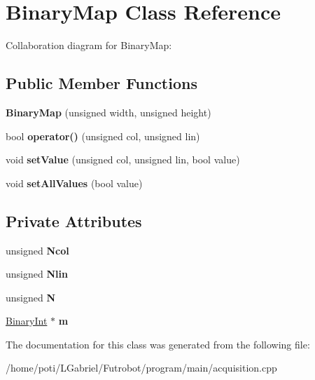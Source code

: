 \hypertarget{classBinaryMap}{}\section{Binary\+Map Class Reference}
\label{classBinaryMap}


Collaboration diagram for Binary\+Map\+:
\subsection*{Public Member Functions}
\begin{DoxyCompactItemize}
\item 
{\bfseries Binary\+Map} (unsigned width, unsigned height)\hypertarget{classBinaryMap_a31956e294536f47cc2a45bad2fd2e9c6}{}\label{classBinaryMap_a31956e294536f47cc2a45bad2fd2e9c6}

\item 
bool {\bfseries operator()} (unsigned col, unsigned lin)\hypertarget{classBinaryMap_aa6cf630265a7f7fa9193d03ecae69c5e}{}\label{classBinaryMap_aa6cf630265a7f7fa9193d03ecae69c5e}

\item 
void {\bfseries set\+Value} (unsigned col, unsigned lin, bool value)\hypertarget{classBinaryMap_a372cd8877bbe91906238a710c37a2697}{}\label{classBinaryMap_a372cd8877bbe91906238a710c37a2697}

\item 
void {\bfseries set\+All\+Values} (bool value)\hypertarget{classBinaryMap_aa1547190179d7236bcf7b16a0187f9d8}{}\label{classBinaryMap_aa1547190179d7236bcf7b16a0187f9d8}

\end{DoxyCompactItemize}
\subsection*{Private Attributes}
\begin{DoxyCompactItemize}
\item 
unsigned {\bfseries Ncol}\hypertarget{classBinaryMap_aa9894ad80eb49c39251d2b9aab34cf1f}{}\label{classBinaryMap_aa9894ad80eb49c39251d2b9aab34cf1f}

\item 
unsigned {\bfseries Nlin}\hypertarget{classBinaryMap_a4ddad2d9f38ad8752a67e415dbbea1a9}{}\label{classBinaryMap_a4ddad2d9f38ad8752a67e415dbbea1a9}

\item 
unsigned {\bfseries N}\hypertarget{classBinaryMap_af7a0e7d4f10367e30108dad2a62c49a4}{}\label{classBinaryMap_af7a0e7d4f10367e30108dad2a62c49a4}

\item 
\hyperlink{unionBinaryInt}{Binary\+Int} $\ast$ {\bfseries m}\hypertarget{classBinaryMap_a2b009e9915bfb14390019b2e7e7fad6b}{}\label{classBinaryMap_a2b009e9915bfb14390019b2e7e7fad6b}

\end{DoxyCompactItemize}


The documentation for this class was generated from the following file\+:\begin{DoxyCompactItemize}
\item 
/home/poti/\+L\+Gabriel/\+Futrobot/program/main/acquisition.\+cpp\end{DoxyCompactItemize}
